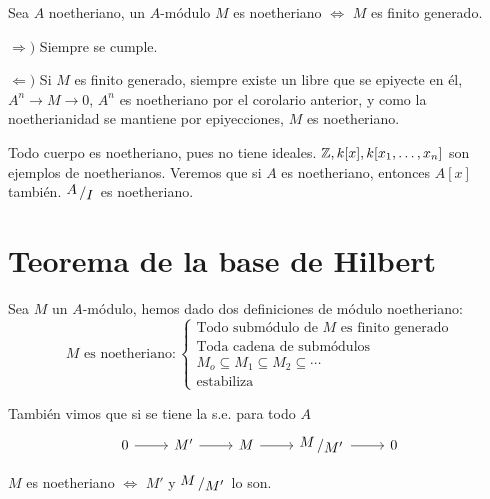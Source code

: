 \begin{prop}
Sea $A$ noetheriano, un $A$-m\'odulo $M$ es noetheriano $\iff$ $M$ es finito generado.     
\end{prop}
\begin{dem}
    $\Rightarrow)$ Siempre se cumple. 
    
    $\Leftarrow)$ Si $M$ es finito generado, siempre existe un libre que se epiyecte en \'el, $A^n \longrightarrow M \longrightarrow 0$, $A^n$ es noetheriano por el corolario anterior, y como la noetherianidad se mantiene por epiyecciones, $M$ es noetheriano. 
\end{dem} 
\begin{ejems}
    Todo cuerpo es noetheriano, pues no tiene ideales. $\mathbb{Z}, k[x], k[x_1, \ldots, x_n]$ son ejemplos de noetherianos. Veremos que si $A$ es noetheriano, entonces $A[x]$ tambi\'en. $\modulo{A}{I}$ es noetheriano.
\end{ejems}

\section{Teorema de la base de Hilbert}
Sea $M$ un $A$-m\'odulo, hemos dado dos definiciones de m\'odulo noetheriano:
$$M \text{ es noetheriano}: \left\{\begin{array}{c}
    \text{Todo subm\'odulo de } M \text{ es finito generado} \\[5mm] \text{Toda cadena de subm\'odulos} \\ M_o \subseteq M_1 \subseteq M_2 \subseteq \cdots \\ 
    \text{estabiliza}
\end{array} \right.$$

Tambi\'en vimos que si se tiene la s.e. para todo $A$ $$\bt 0 \rar & M' \rar &M \rar & \modulo{M}{M'} \rar & 0 \et$$

$M$ es noetheriano $\iff$ $M'$ y $\modulo{M}{M'}$ lo son.

